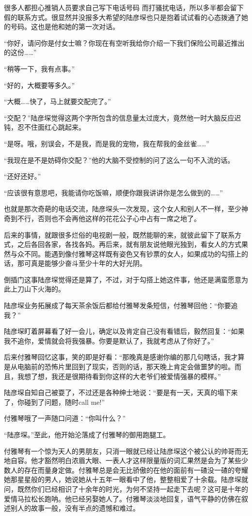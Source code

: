 \documentclass[11pt,a4paper]{article}
\begin{document}
很多人都担心推销人员要求自己写下电话号码 而打骚扰电话，所以多半都会留下假的联系方式。很显然并没报多大希望的陆彦堔也只是抱着试试看的心态拨通了她的号码。这也是他和她的第一次对话。﻿﻿

“你好，请问你是付女士嘛？你现在有空听我给你介绍一下我们保险公司最近推出的这份……”﻿﻿

“稍等一下，我有点事。”﻿﻿

“好的，大概要等多久。”﻿﻿

“大概……快了，马上就要交配完了。”﻿﻿

“交配？”陆彦堔觉得这两个字所包含的信息量太过庞大，竟然他一时大脑反应迟钝，忍不住面红心跳起来。﻿﻿

“是呀。哦，别误会，不是我，而是我的宠物，我在帮我的金丝雀……”﻿﻿

“我现在是不是妨碍你交配？”他的大脑不受控制的问了这么一句不入流的话。﻿﻿

“还好还好。”﻿

“应该很有意思吧，我能请你吃饭嘛，顺便你跟我讲讲你是怎么做到的……”﻿﻿

也就是那次奇葩的电话交流，陆彦堔头一次发现，这个女人和别人不一样，至少神奇到不行，否则也不会再他这样的花花公子心中占有一席之地了。﻿﻿

后来的事情，就跟很多烂俗的电视剧一般，既然能聊的来，就彼此留下了联系方式，之后各回各家，各找各妈。再后来，就有朋友说他眼光独到，看女人的方式果然与众不同。能遇到像付雅琴这样既有姿色又有钞票的女人，如果成功的勾搭上的话，那可真是能够少奋斗至少十年的大好光阴。﻿﻿

倒插门这事陆彦堔觉得还是算了，不过，对于勾搭上她这件事，他还是满蛮愿意为此上刀山下火海的。﻿﻿

陆彦堔业务拓展成了每天茶余饭后都给付雅琴发条短信，付雅琴回他：“你要追我？”﻿﻿

陆彦堔盯着屏幕看了好一会儿，确定以及肯定自己没有看错后，毅然回复：“如果我不追你，爱情就会将我强暴。你要是默认了，我就考虑从了你好了。”﻿﻿

后来付雅琴回忆这事，笑的即是好看：“那晚真是感谢你编的那几句瞎话，我才算是从电脑前的恐怖片里回到了现实，否则的话，那天晚上肯定会做噩梦的啦。而且，我想了想，我还是很期待看到你这样的大老爷们被爱情强暴的模样。”﻿﻿

陆彦堔自知自己被耍了，不过还是各种绅士地说：“要是有一天，天真的塌下来了，你碰到了问题，随时call me!”﻿﻿

付雅琴哦了一声随口问道：“你叫什么？”﻿﻿

“陆彦堔。”至此，他开始沦落成了付雅琴的御用跑腿工。﻿﻿

付雅琴有一个惊为天人的男朋友，只消一眼就已经让陆彦堔这个被公认的帅哥而无地自容。他才豁然明白浓眉大眼、一表人才这样限量版的词汇果然是会为了某些少数人的存在而量身定做。付雅琴总是会无比骄傲的在他的面前有一碴没一碴的夸耀她那星星般的男人，她说她从十五年一眼看中了他，整整相爱了十余载。陆彦堔就问，既然你们已经相识了十余年的时光，为何不坚持一起走下去呢？这可是十年的爱情马拉松长跑呐。他已经另娶她人了。付雅琴淡淡地回复，语气平静的仿佛在叙述别人的故事一般，没有半点的遗憾和难过。﻿﻿
\end{document}
